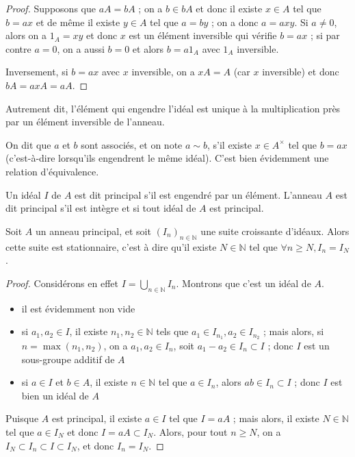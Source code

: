 \begin{proof}
Supposons que $aA = bA$ ; on a $b \in bA$ et donc il existe $x \in A$ tel que $b = ax$ et de même il existe $y \in A$ tel que $a = by$ ; on a donc $a = axy$. Si $a \neq 0$, alors on a $1_A = xy$ et donc $x$ est un élément inversible qui vérifie $b = ax$ ; si par contre $a = 0$, on a aussi $b = 0$ et alors $b = a1_A$ avec $1_A$ inversible.

Inversement, si $b = ax$ avec $x$ inversible, on a $xA = A$ (car $x$ inversible) et donc $bA = axA = aA$.
\end{proof}

\begin{rem}
Autrement dit, l'élément qui engendre l'idéal est unique
à la multiplication près par un élément inversible de l'anneau.
\end{rem}

\begin{de}
On dit que $a$ et $b$ sont associés, et on note $a \sim b$,
s'il existe $x \in A^\times$ tel que $b = ax$ (c'est-à-dire lorsqu'ils
engendrent le même idéal). C'est bien évidemment une relation
d'équivalence.
\end{de}

\begin{de}
Un idéal $I$ de $A$ est dit principal s'il est engendré
par un élément. L'anneau $A$ est dit principal s'il est intègre et si tout
idéal de $A$ est principal.
\end{de}

\begin{thm}
Soit $A$ un anneau principal, et
soit $(I_n)_{n \in \mathbb{N}}$ une suite croissante d'idéaux. Alors
cette suite est stationnaire, c'est à dire qu'il existe $N \in \mathbb{N}$ tel que
$\forall n \geq N, I_n = I_N$.
\end{thm}

\begin{proof}
Considérons en effet $I = \bigcup_{n \in \mathbb{N}} I_n$. Montrons que
c'est un idéal de $A$.

\begin{itemize}
\itemsep1pt\parskip0pt
\item
  il est évidemment non vide
\item
  si $a_1, a_2 \in I$, il existe $n_1, n_2 \in \mathbb{N}$ tels que $a_1 \in I_{n_1}, a_2 \in I_{n_2}$ ; mais alors, si $n = \max(n_1, n_2)$, on a $a_1, a_2 \in I_n$, soit $a_1 - a_2 \in I_n \subset I$ ;
  donc $I$ est un sous-groupe additif de $A$
\item
  si $a \in I$ et $b \in A$, il existe $n \in \mathbb{N}$ tel que $a \in I_n$, alors $ab \in I_n \subset I$ ; donc $I$ est bien un idéal de $A$
\end{itemize}

Puisque $A$ est principal, il existe $a \in I$ tel que $I = aA$ ; mais alors, il
existe $N \in \mathbb{N}$ tel que $a \in I_N$ et donc $I = aA \subset I_N$.
Alors, pour tout $n \geq N$, on a $I_N \subset I_n \subset I \subset I_N$, et donc $I_n = I_N$.
\end{proof}

